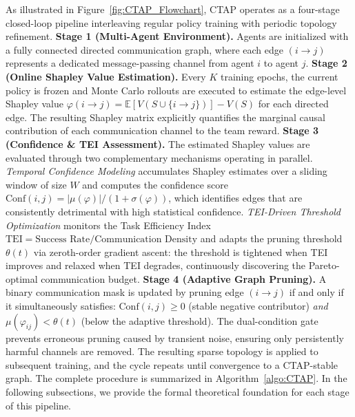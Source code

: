 \documentclass{article}
\begin{document}
As illustrated in Figure~\ref{fig:CTAP_Flowchart}, CTAP operates as a four-stage closed-loop pipeline interleaving regular policy training with periodic topology refinement.
\textbf{Stage 1 (Multi-Agent Environment).} Agents are initialized with a fully connected directed communication graph, where each edge $(i \to j)$ represents a dedicated message-passing channel from agent $i$ to agent $j$.
\textbf{Stage 2 (Online Shapley Value Estimation).} Every $K$ training epochs, the current policy is frozen and Monte Carlo rollouts are executed to estimate the edge-level Shapley value $\varphi(i \to j) = \mathbb{E}[V(S \cup \{i \to j\})] - V(S)$ for each directed edge. The resulting Shapley matrix explicitly quantifies the marginal causal contribution of each communication channel to the team reward.
\textbf{Stage 3 (Confidence \& TEI Assessment).} The estimated Shapley values are evaluated through two complementary mechanisms operating in parallel. \textit{Temporal Confidence Modeling} accumulates Shapley estimates over a sliding window of size $W$ and computes the confidence score $\text{Conf}(i,j) = |\mu(\varphi)| / (1 + \sigma(\varphi))$, which identifies edges that are consistently detrimental with high statistical confidence. \textit{TEI-Driven Threshold Optimization} monitors the Task Efficiency Index $\text{TEI} = \text{Success Rate} / \text{Communication Density}$ and adapts the pruning threshold $\theta(t)$ via zeroth-order gradient ascent: the threshold is tightened when TEI improves and relaxed when TEI degrades, continuously discovering the Pareto-optimal communication budget.
\textbf{Stage 4 (Adaptive Graph Pruning).} A binary communication mask is updated by pruning edge $(i \to j)$ if and only if it simultaneously satisfies: $\text{Conf}(i,j) \ge 0$ (stable negative contributor) \textit{and} $\mu(\varphi_{ij}) < \theta(t)$ (below the adaptive threshold). The dual-condition gate prevents erroneous pruning caused by transient noise, ensuring only persistently harmful channels are removed. The resulting sparse topology is applied to subsequent training, and the cycle repeats until convergence to a CTAP-stable graph. The complete procedure is summarized in Algorithm~\ref{algo:CTAP}. In the following subsections, we provide the formal theoretical foundation for each stage of this pipeline.
\end{document}
